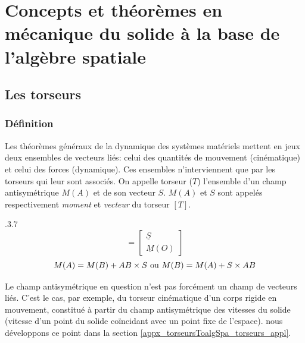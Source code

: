 \chapter{Concepts et théorèmes en mécanique du solide à la base de l'algèbre spatiale} \label{appx_torseursToalgSpa}

\section{Les torseurs} \label{appx_torseursToalgSpa_torseurs}


\subsection{Définition} \label{appx_torseursToalgSpa_torseurs_def}
Les théorèmes généraux de la dynamique des systèmes matériels mettent en jeux deux ensembles de vecteurs liés: celui des quantités de mouvement (cinématique) et celui des forces (dynamique). Ces ensembles n'interviennent que par les torseurs qui leur sont associés. On appelle torseur ($T$) l'ensemble d'un champ antisymétrique $M(A)$ et de son vecteur $S$. $M(A)$ et $S$ sont appelés respectivement \emph{moment} et \emph{vecteur} du torseur $[T]$.

\vspace{0.3cm} %

{.3}{.7}{}
{%
\begin{equation*}
[\underline{T}]=
\begin{bmatrix}
  \underline{S} \\
  \underline{M}(O)
\end{bmatrix}
\end{equation*}
}
{%
\begin{equation}
M(A)=M(B)+AB \times S \textnormal{ ou } M(B)=M(A)+S \times AB
\end{equation}
}
{}

\vspace{0.3cm} %

Le champ antisymétrique en question n'est pas forcément un champ de vecteurs liés. C'est le cas, par exemple, du torseur cinématique d'un corps rigide en mouvement, constitué à partir du champ antisymétrique des vitesses du solide (vitesse d'un point du solide coïncidant avec un point fixe de l'espace). nous développons ce point dans la section \ref{appx_torseursToalgSpa_torseurs_appl}.

